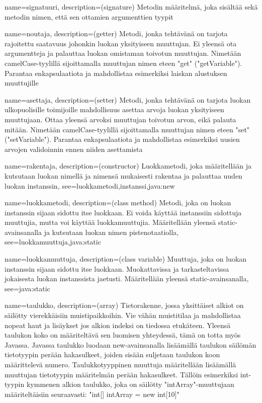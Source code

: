 {
	name=signatuuri,
	description={(signature) Metodin määritelmä, joka sisältää sekä metodin nimen, että sen
ottamien argumenttien tyypit}
}

{
	name=noutaja,
	description={(getter) Metodi, jonka tehtävänä on tarjota rajoitettu saatavuus johonkin
luokan yksityiseen muuttujan. Ei yleensä ota argumentteja ja palauttaa luokan omistaman toivotun
muuttujan. Nimetään camelCase-tyylillä sijoittamalla muuttujan nimen eteen "get" ("getVariable").
Parantaa enkapsulaatiota ja mahdollistaa esimerkiksi laiskan alustuksen muuttujille}
}

{
	name=asettaja,
	description={(setter) Metodi, jonka tehtävänä on tarjota luokan ulkopuolisille toimijoille
mahdollisuus asettaa arvoja luokan yksityiseen muuttujaan. Ottaa yleensä arvoksi muuttujan toivotun
arvon, eikä palauta mitään. Nimetään camelCase-tyylillä sijoittamalla muuttujan nimen eteen "set"
("setVariable"). Parantaa enkapsulaatiota ja mahdollistaa esimerkiksi uusien arvojen validoinnin
ennen niiden asettamista}
}

{
	name=rakentaja,
	description={(constructor) Luokkametodi, joka määritellään ja kutsutaan luokan nimellä ja nimensä
mukaisesti rakentaa ja palauttaa uuden luokan instanssin},
	see={luokkametodi,instanssi,java:new}
}

{
	name=luokkametodi,
	description={(class method) Metodi, joka on luokan instanssin sijaan sidottu itse luokkaan.
Ei voida käyttää instanssiin sidottuja muuttujia, mutta voi käyttää luokkamuuttujia. Määritellään
yleensä static-avainsanalla ja kutsutaan luokan nimen pistenotaatiolla},
	see={luokkamuuttuja,java:static}
}

{
	name=luokkamuuttuja,
	description={(class variable) Muuttuja, joka on luokan instanssin sijaan sidottu itse luokkaan.
Muokattavissa ja tarkasteltavissa jokaisesta luokan instanssista jaetusti. Määritellään yleensä
static-avainsanalla},
	see=java:static
}

{
	name=taulukko,
	description={(array) Tietorakenne, jossa yksittäiset alkiot on säilötty vierekkäisiin
muistipaikkoihin. Vie vähän muistitilaa ja mahdollistaa nopeat haut ja lisäykset jos alkion
indeksi on tiedossa etukäteen. Yleensä taulukon koko on määriteltävä sen luomisen yhteydessä,
tämä on totta myös Javassa. Javassa taulukko luodaan new-avainsanalla lisäämällä taulukon
säilömän tietotyypin perään hakasulkeet, joiden sisään suljetaan taulukon koon määrittelevä
numero. Taulukkotyyppinen muuttuja määritellään lisäämällä muuttujan tietotyypin määritelmän
perään hakasulkeet. Tällöin esimerkiksi int-tyypin kymmenen alkion taulukko, joka on säilötty
"intArray"-muuttujaan määriteltäisiin seuraavasti:\newline{} "int[] intArray = new int[10]"}
}

